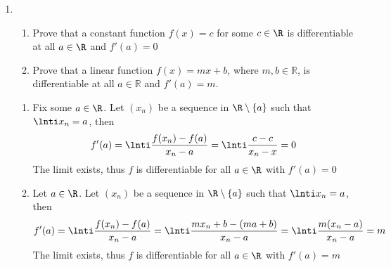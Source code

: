 \documentclass[11pt]{exam}
\begin{document}
    \begin{enumerate}
        

        \item 
        \begin{enumerate}
            \item Prove that a constant function $f(x) = c$ for some $c\in\R$ is differentiable at all $a \in \R$
            and $f'(a) = 0$
            \item Prove that a linear function \(f(x) = mx + b\), where \(m, b \in \mathbb{R}\), is differentiable at all \(a \in \mathbb{R}\) and \(f'(a) = m\).
        \end{enumerate}
            \begin{solution}
                \begin{enumerate}
                    \item Fix some $a \in \R$. Let $(x_n)$ be a sequence in $\R \setminus \{a\}$ such that $\lnti x_n = a$, then 
                    $$f'(a) = \lnti \frac{f(x_n) - f(a)}{x_n - a} = \lnti \frac{c - c}{x_n - x} = 0$$
                    The limit exists, thus $f$ is differentiable for all $a \in \R$ with $f'(a) = 0$
                    \item Let $a \in \R$.  Let $(x_n)$ be a sequence in $\R \setminus \{a\}$ such that $\lnti x_n = a$, then 
                    $$f'(a) = \lnti \frac{f(x_n) - f(a)}{x_n - a} = \lnti \frac{mx_n + b - (ma + b)}{x_n - a} = \lnti \frac{m(x_n-a)}{x_n -a} = m$$
                    The limit exists, thus $f$ is differentiable for all $a \in \R$ with $f'(a) = m$
                \end{enumerate}
            \end{solution}


\end{enumerate}
\end{document}
